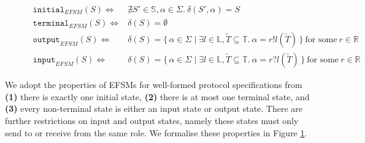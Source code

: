 \begin{figure}[!h]
\doublespacing
\[
\begin{array}{rl}

\texttt{initial}_{EFSM}(S) \iff & \nexists S' \in \mathbb{S},\alpha \in \Sigma.~\delta(S',\alpha) = S \\
\texttt{terminal}_{EFSM}(S) \iff & \delta(S) = \emptyset \\
\texttt{output}_{EFSM}(S) \iff & \delta(S) = \{\,\alpha \in \Sigma \mid \exists l \in \mathbb{L}, \tilde{T} \subseteq{\mathbb{T}}.~\alpha = r!l(\tilde{T})\,\}~\text{for some}~r \in \mathbb{R} \\
\texttt{input}_{EFSM}(S) \iff & \delta(S) = \{\,\alpha \in \Sigma \mid \exists l \in \mathbb{L}, \tilde{T} \subseteq{\mathbb{T}}.~\alpha = r?l(\tilde{T})\,\}~\text{for some}~r \in \mathbb{R}
\end{array}
\]
\singlespacing
{}
\label{fig:efsmstates}
\end{figure}

We adopt the properties of EFSMs for well-formed protocol specifications from \cite{Hybrid2016} \textbf{(1)} there is exactly one initial state, \textbf{(2)} there is at most one terminal state, and \textbf{(3)} every non-terminal state is either an input state or output state. There are further restrictions on input and output states, namely these states must only send to or receive from the same role. We formalise these properties in Figure \ref{fig:efsmstates}.

